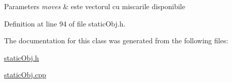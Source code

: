 \begin{DoxyParams}{Parameters}
{\em moves} & este vectorul cu miscarile disponibile \\
\hline
\end{DoxyParams}


Definition at line 94 of file static\-Obj.\-h.



The documentation for this class was generated from the following files\-:\begin{DoxyCompactItemize}
\item 
\hyperlink{static_obj_8h}{static\-Obj.\-h}\item 
\hyperlink{static_obj_8cpp}{static\-Obj.\-cpp}\end{DoxyCompactItemize}
